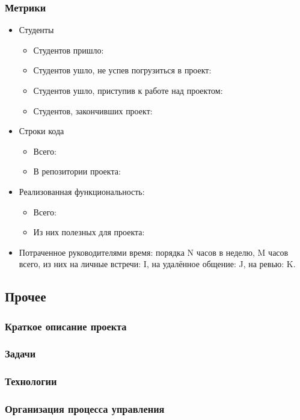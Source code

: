 \documentclass[a5paper]{article}
\begin{document}
\subsubsection{Метрики}
\begin{itemize}
	\item Студенты
		\begin{itemize}
			\item Студентов пришло: 
			\item Студентов ушло, не успев погрузиться в проект:
			\item Студентов ушло, приступив к работе над проектом:
			\item Студентов, закончивших проект:
		\end{itemize}
	\item Строки кода
		\begin{itemize}
			\item Всего:
			\item В репозитории проекта:
		\end{itemize}
	\item Реализованная функциональность:
		\begin{itemize}
			\item Всего: 
			\item Из них полезных для проекта: 
		\end{itemize}
	\item Потраченное руководителями время: порядка N часов в неделю, M часов всего, из них на личные встречи: I, на удалённое общение: J, на ревью: K.
\end{itemize}


\subsection{Прочее}

\subsubsection{Краткое описание проекта}

\subsubsection{Задачи}

\subsubsection{Технологии}

\subsubsection{Организация процесса управления}
\end{document}
